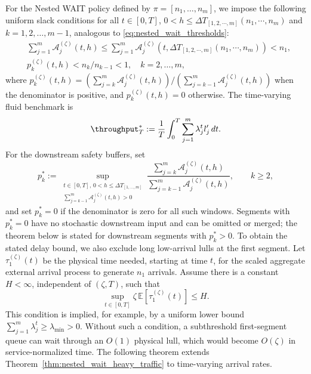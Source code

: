 For the Nested WAIT policy defined by $\pi = [n_1, \dots, n_m]$, we impose the following uniform slack conditions for all $t\in [0, T]$, $0<h\leq \Delta T_{[1,2,\cdots,m]}(n_1,\cdots,n_m)$ and $k = 1, 2, \dots, m-1$, analogous to \eqref{eq:nested_wait_thresholds}:
\begin{equation}
    \label{eq:nested_wait_thresholds_time_varying}
\begin{aligned}
        & \sum_{j=1}^m \mathcal A_j^{(\zeta)}(t,h)
        \leq
        \sum_{j=1}^m \mathcal A_j^{(\zeta)}\!\left(t,\Delta T_{[1,2,\cdots,m]}(n_1,\cdots,n_m)\right)< n_1, \\
        & p_k^{(\zeta)}(t,h) < n_k/n_{k-1} < 1,\quad k=2,\dots,m,
\end{aligned}
\end{equation}
where \(p_k^{(\zeta)}(t,h)=(\sum_{j=k}^m\mathcal A_j^{(\zeta)}(t,h))/(\sum_{j=k-1}^m\mathcal A_j^{(\zeta)}(t,h))\) when the denominator is positive, and \(p_k^{(\zeta)}(t,h)=0\) otherwise. The time-varying fluid benchmark is
\[
    \throughput_T^*
    :=
    \frac{1}{T}\int_0^T\sum_{j=1}^m\lambda_j^t l_j'\,dt .
\]
For the downstream safety buffers, set
\[
    p_k^*
    :=
    \sup_{\substack{t\in[0,T],\,0<h\le \Delta T_{[1,\dots,m]}\\
    \sum_{j=k-1}^m\mathcal A_j^{(\zeta)}(t,h)>0}}
    \frac{\sum_{j=k}^m\mathcal A_j^{(\zeta)}(t,h)}
    {\sum_{j=k-1}^m\mathcal A_j^{(\zeta)}(t,h)},\qquad k\ge2,
\]
and set \(p_k^*=0\) if the denominator is zero for all such windows.
Segments with \(p_k^*=0\) have no stochastic downstream input and can be omitted or merged; the theorem below is stated for downstream segments with \(p_k^*>0\).
To obtain the stated delay bound, we also exclude long low-arrival lulls at the first segment. Let \(\tau_1^{(\zeta)}(t)\) be the physical time needed, starting at time \(t\), for the scaled aggregate external arrival process to generate \(n_1\) arrivals. Assume there is a constant \(H<\infty\), independent of \((\zeta,T)\), such that
\[
    \sup_{t\in[0,T]}\zeta\,\mathbb E[\tau_1^{(\zeta)}(t)]\le H .
\]
This condition is implied, for example, by a uniform lower bound \(\sum_{j=1}^m\lambda_j^t\ge\lambda_{\min}>0\). Without such a condition, a subthreshold first-segment queue can wait through an \(O(1)\) physical lull, which would become \(O(\zeta)\) in service-normalized time.
The following theorem extends Theorem~\ref{thm:nested_wait_heavy_traffic} to time-varying arrival rates.

